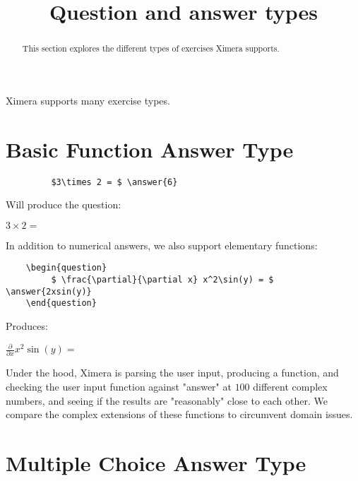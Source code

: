 \documentclass{ximera}
\title{Question and answer types}
\begin{document}
	\begin{abstract}
		This section explores the different types of exercises Ximera supports. 
	\end{abstract}

\maketitle
	
Ximera supports many exercise types.
	
	
\section{Basic Function Answer Type}	
\begin{verbatim}
         $3\times 2 = $ \answer{6}
\end{verbatim}

Will produce the question:

\begin{question}
            $3\times 2 = $ 
\end{question}

In addition to numerical answers, we also support elementary functions:

\begin{verbatim}
    \begin{question}
         $ \frac{\partial}{\partial x} x^2\sin(y) = $ \answer{2xsin(y)}
    \end{question}
\end{verbatim}

Produces:

  \begin{question}
       $ \frac{\partial}{\partial x} x^2\sin(y) = $ 
  \end{question}
    
\begin{remark}
Under the hood, Ximera is parsing the user input, producing a function, and checking the user input function against "answer" at 
$100$ different complex numbers, and seeing if the results are "reasonably" close to each other.  
We compare the complex extensions of these functions to circumvent domain issues.
\end{remark}

\section{Multiple Choice Answer Type}
\end{document}
